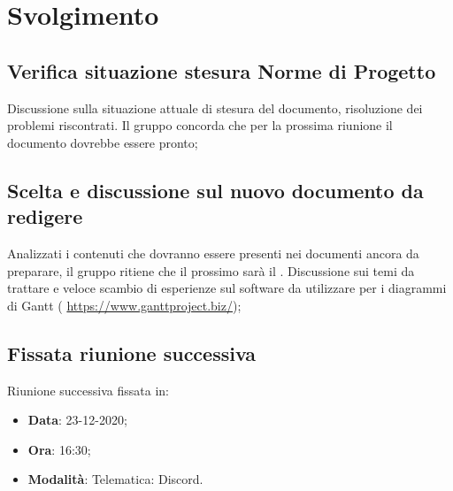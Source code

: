 \documentclass[]{article}
\begin{document}
	\newpage

	\section{Svolgimento}
		\subsection{Verifica situazione stesura Norme di Progetto}
		Discussione sulla situazione attuale di stesura del documento, risoluzione dei problemi riscontrati. Il gruppo concorda che per la prossima riunione il documento dovrebbe essere pronto;

		\subsection{Scelta e discussione sul nuovo documento da redigere}
		Analizzati i contenuti che dovranno essere presenti nei documenti ancora da preparare, il gruppo ritiene che il prossimo sarà il . Discussione sui temi da trattare e veloce scambio di esperienze sul software da utilizzare per i diagrammi di Gantt ( \url{https://www.ganttproject.biz/});

		\subsection{Fissata riunione successiva}
		Riunione successiva fissata in:
		\begin{itemize}
			\item \textbf{Data}: 23-12-2020;
			\item \textbf{Ora}: 16:30;
			\item \textbf{Modalità}: Telematica: Discord.
		\end{itemize}
	
\end{document}

